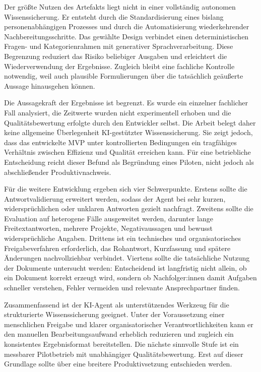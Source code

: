 \documentclass[
  10pt,
  ngerman,
  a4paper,
  toc=graduated,
  numbers=noenddot,
  headings=standardclasses,
  nonumberlist
]{scrartcl}
\begin{document}
Der größte Nutzen des Artefakts liegt nicht in einer vollständig autonomen Wissenssicherung. Er entsteht durch die Standardisierung eines bislang personenabhängigen Prozesses und durch die Automatisierung wiederkehrender Nachbereitungsschritte. Das gewählte Design verbindet einen deterministischen Fragen- und Kategorienrahmen mit generativer Sprachverarbeitung. Diese Begrenzung reduziert das Risiko beliebiger Ausgaben und erleichtert die Wiederverwendung der Ergebnisse. Zugleich bleibt eine fachliche Kontrolle notwendig, weil auch plausible Formulierungen über die tatsächlich geäußerte Aussage hinausgehen können.

Die Aussagekraft der Ergebnisse ist begrenzt. Es wurde ein einzelner fachlicher Fall analysiert, die Zeitwerte wurden nicht experimentell erhoben und die Qualitätsbewertung erfolgte durch den Entwickler selbst. Die Arbeit belegt daher keine allgemeine Überlegenheit KI-gestützter Wissenssicherung. Sie zeigt jedoch, dass das entwickelte MVP unter kontrollierten Bedingungen ein tragfähiges Verhältnis zwischen Effizienz und Qualität erreichen kann. Für eine betriebliche Entscheidung reicht dieser Befund als Begründung eines Piloten, nicht jedoch als abschließender Produktivnachweis.

Für die weitere Entwicklung ergeben sich vier Schwerpunkte. Erstens sollte die Antwortvalidierung erweitert werden, sodass der Agent bei sehr kurzen, widersprüchlichen oder unklaren Antworten gezielt nachfragt. Zweitens sollte die Evaluation auf heterogene Fälle ausgeweitet werden, darunter lange Freitextantworten, mehrere Projekte, Negativaussagen und bewusst widersprüchliche Angaben. Drittens ist ein technisches und organisatorisches Freigabeverfahren erforderlich, das Rohantwort, Kurzfassung und spätere Änderungen nachvollziehbar verbindet. Viertens sollte die tatsächliche Nutzung der Dokumente untersucht werden: Entscheidend ist langfristig nicht allein, ob ein Dokument korrekt erzeugt wird, sondern ob Nachfolger:innen damit Aufgaben schneller verstehen, Fehler vermeiden und relevante Ansprechpartner finden.

Zusammenfassend ist der KI-Agent als unterstützendes Werkzeug für die strukturierte Wissenssicherung geeignet. Unter der Voraussetzung einer menschlichen Freigabe und klarer organisatorischer Verantwortlichkeiten kann er den manuellen Bearbeitungsaufwand erheblich reduzieren und zugleich ein konsistentes Ergebnisformat bereitstellen. Die nächste sinnvolle Stufe ist ein messbarer Pilotbetrieb mit unabhängiger Qualitätsbewertung. Erst auf dieser Grundlage sollte über eine breitere Produktivsetzung entschieden werden.
\end{document}

